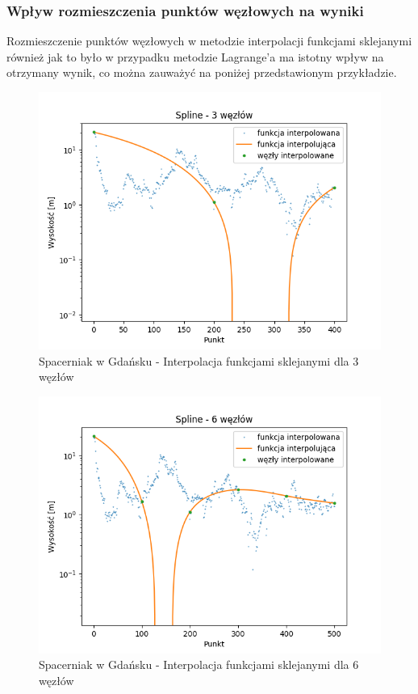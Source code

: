\documentclass[12pt]{extarticle}
\begin{document}
\subsubsection*{Wpływ rozmieszczenia punktów węzłowych na wyniki}
Rozmieszczenie punktów węzłowych w metodzie  interpolacji funkcjami sklejanymi również jak to było w przypadku metodzie Lagrange'a ma istotny wpływ na otrzymany wynik, co można zauważyć na poniżej przedstawionym przykładzie.
\begin{figure}[H]
    \centering
    \includegraphics[scale=0.8]{interpolation_SpacerniakGdansk_Spline_3.png}
    \caption{Spacerniak w Gdańsku - Interpolacja funkcjami sklejanymi dla 3 węzłów}
\end{figure}
\begin{figure}[H]
    \centering
    \includegraphics[scale=0.8]{interpolation_SpacerniakGdansk_Spline_6.png}
    \caption{Spacerniak w Gdańsku - Interpolacja funkcjami sklejanymi dla 6 węzłów}
\end{figure}
\end{document}
